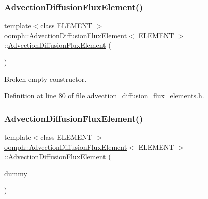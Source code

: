 \subsubsection{\texorpdfstring{Advection\+Diffusion\+Flux\+Element()}{AdvectionDiffusionFluxElement()}\hspace{0.1cm}{\footnotesize\ttfamily [2/3]}}
{\footnotesize\ttfamily template$<$class E\+L\+E\+M\+E\+NT $>$ \\
\hyperlink{classoomph_1_1AdvectionDiffusionFluxElement}{oomph\+::\+Advection\+Diffusion\+Flux\+Element}$<$ E\+L\+E\+M\+E\+NT $>$\+::\hyperlink{classoomph_1_1AdvectionDiffusionFluxElement}{Advection\+Diffusion\+Flux\+Element} (\begin{DoxyParamCaption}{ }\end{DoxyParamCaption})\hspace{0.3cm}{\ttfamily [inline]}}



Broken empty constructor. 



Definition at line 80 of file advection\+\_\+diffusion\+\_\+flux\+\_\+elements.\+h.

\mbox{\label{classoomph_1_1AdvectionDiffusionFluxElement_a187a597274ed7d129da3b1cd89196f44}} 
\subsubsection{\texorpdfstring{Advection\+Diffusion\+Flux\+Element()}{AdvectionDiffusionFluxElement()}\hspace{0.1cm}{\footnotesize\ttfamily [3/3]}}
{\footnotesize\ttfamily template$<$class E\+L\+E\+M\+E\+NT $>$ \\
\hyperlink{classoomph_1_1AdvectionDiffusionFluxElement}{oomph\+::\+Advection\+Diffusion\+Flux\+Element}$<$ E\+L\+E\+M\+E\+NT $>$\+::\hyperlink{classoomph_1_1AdvectionDiffusionFluxElement}{Advection\+Diffusion\+Flux\+Element} (\begin{DoxyParamCaption}\item[{const \hyperlink{classoomph_1_1AdvectionDiffusionFluxElement}{Advection\+Diffusion\+Flux\+Element}$<$ E\+L\+E\+M\+E\+NT $>$ \&}]{dummy }\end{DoxyParamCaption})\hspace{0.3cm}{\ttfamily [inline]}}



